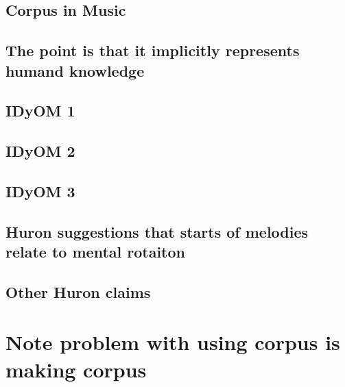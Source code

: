 \documentclass[]{book}
\theoremstyle{definition}
\theoremstyle{definition}
\theoremstyle{definition}
\theoremstyle{remark}
\begin{document}
\hypertarget{corpus-in-music}{%
\subsection{Corpus in Music}\label{corpus-in-music}}

\hypertarget{the-point-is-that-it-implicitly-represents-humand-knowledge}{%
\subsection{The point is that it implicitly represents humand
knowledge}\label{the-point-is-that-it-implicitly-represents-humand-knowledge}}

\hypertarget{idyom-1}{%
\subsection{IDyOM 1}\label{idyom-1}}

\hypertarget{idyom-2}{%
\subsection{IDyOM 2}\label{idyom-2}}

\hypertarget{idyom-3}{%
\subsection{IDyOM 3}\label{idyom-3}}

\hypertarget{huron-suggestions-that-starts-of-melodies-relate-to-mental-rotaiton}{%
\subsection{Huron suggestions that starts of melodies relate to mental
rotaiton}\label{huron-suggestions-that-starts-of-melodies-relate-to-mental-rotaiton}}

\hypertarget{other-huron-claims}{%
\subsection{Other Huron claims}\label{other-huron-claims}}

\hypertarget{note-problem-with-using-corpus-is-making-corpus}{%
\section{Note problem with using corpus is making
corpus}\label{note-problem-with-using-corpus-is-making-corpus}}
\end{document}
